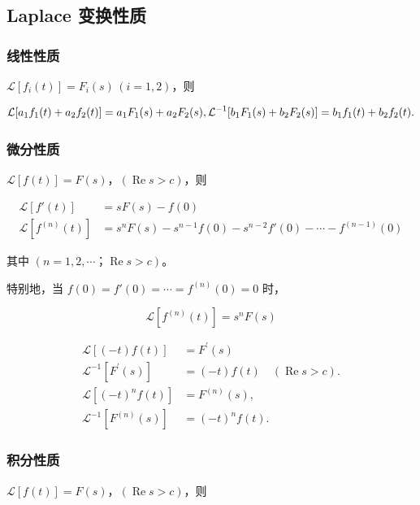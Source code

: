 \subsection{Laplace 变换性质}
\label{laplace-变换性质}
\subsubsection{线性性质}
\label{线性性质}
\(\mathcal{L}[f_{i}(t)]=F_{i}(s)\,(i=1,2)\)，则

\[
\mathcal{L}[a_{1} f_{1}(t)+a_{2} f_{2}(t)]=a_{1} F_{1}(s)+a_{2} F_{2}(s), \\
\mathcal{L}^{-1}[b_{1} F_{1}(s)+b_{2} F_{2}(s)]=b_{1} f_{1}(t)+b_{2} f_{2}(t).
\]
\subsubsection{微分性质}
\label{微分性质}
\(\mathcal{L}[f(t)]=F(s)，(\operatorname{Re}s > c)\)，则

\begin{align*}
    \mathcal{L}[f'(t)] &= sF(s)-f(0) \\
    \mathcal{L} \left[ f^{(n)}(t) \right] &=s^n F(s) - s^{n-1} f(0) - s^{n-2} f'(0) - \cdots - f^{(n-1)}(0)
\end{align*}

其中 \((n=1,2,\cdots；\operatorname{Re}s > c)\)。

特别地，当 \(f(0) = f'(0) = \cdots = f^{(n)}(0) = 0\) 时，

\[
\mathcal{L}\left[ f^{(n)}(t) \right]=s^n F(s)
\]

\begin{tcolorbox}[title={像函数微分性质},colback=red!5!white
,colframe=red!75!black
,colbacktitle=yellow!50!red
,coltitle=red!25!black, fonttitle=\bfseries,subtitle style={boxrule=0.4pt, colback=yellow!50!red!25!white}]
\begin{align*}
    \mathcal{L}[(-t)f(t)]&=F^{\prime}(s) \\
    \mathcal{L}^{-1}[F^{\prime}(s)]&=(-t)f(t)\quad(\operatorname{Re} s>c). \\
    \mathcal{L}\left[(-t)^{n} f(t)\right]&=F^{(n)}(s), \\
    \mathcal{L}^{-1}\left[F^{(n)}(s)\right]&=(-t)^{n}f(t).
\end{align*}

\end{tcolorbox}
\subsubsection{积分性质}
\label{积分性质}
\(\mathcal{L}[f(t)]=F(s)，(\operatorname{Re}s > c)\)，则


